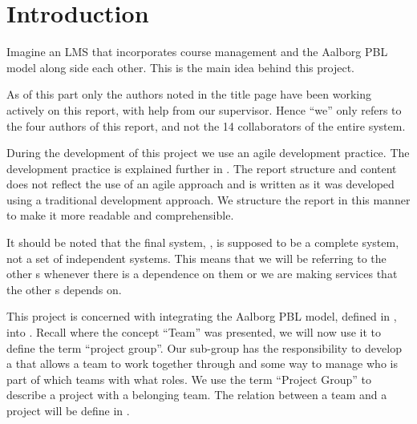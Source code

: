 \chapter{Introduction}
\label{chap:introProjectgroup}
Imagine an LMS that incorporates course management and the Aalborg PBL model along side each other.
This is the main idea behind this project.

As of this part only the authors noted in the title page have been working actively on this report, with help from our supervisor.
Hence ``we'' only refers to the four authors of this report, and not the 14 collaborators of the entire system.

During the development of this project we use an agile development practice. 
The development practice is explained further in . 
The report structure and content does not reflect the use of an agile approach and is written as it was developed using a traditional development approach. 
We structure the report in this manner to make it more readable and comprehensible. 

It should be noted that the final system, \system{}, is supposed to be a complete system, not a set of independent systems.
This means that we will be referring to the other \subsystem{}s whenever there is a dependence on them or we are making services that the other \subsystem{}s depends on.



This project is concerned with integrating the Aalborg PBL model, defined in , into \moodle.
Recall  where the concept ``Team'' was presented, we will now use it to define the term ``project group''.
Our sub-group has the responsibility to develop a \subsystem{} that allows a team to work together through \moodle{} and some way to manage who is part of which teams with what roles.
We use the term ``Project Group'' to describe a project with a belonging team.
The relation between a team and a project will be define in .






